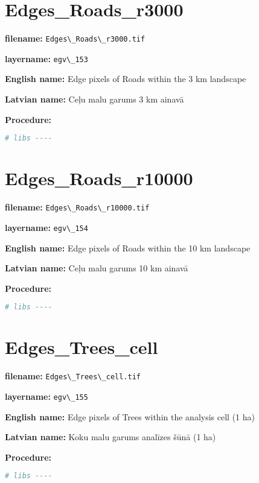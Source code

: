 \documentclass[
]{book}
\newcommand{\passthrough}[1]{#1}
\begin{document}
\section{Edges\_Roads\_r3000}\label{ch06.153}

\textbf{filename:} \passthrough{\lstinline!Edges\_Roads\_r3000.tif!}

\textbf{layername:} \passthrough{\lstinline!egv\_153!}

\textbf{English name:} Edge pixels of Roads within the 3 km landscape

\textbf{Latvian name:} Ceļu malu garums 3 km ainavā

\textbf{Procedure:}

\begin{lstlisting}[language=R]
# libs ----
\end{lstlisting}

\section{Edges\_Roads\_r10000}\label{ch06.154}

\textbf{filename:} \passthrough{\lstinline!Edges\_Roads\_r10000.tif!}

\textbf{layername:} \passthrough{\lstinline!egv\_154!}

\textbf{English name:} Edge pixels of Roads within the 10 km landscape

\textbf{Latvian name:} Ceļu malu garums 10 km ainavā

\textbf{Procedure:}

\begin{lstlisting}[language=R]
# libs ----
\end{lstlisting}

\section{Edges\_Trees\_cell}\label{ch06.155}

\textbf{filename:} \passthrough{\lstinline!Edges\_Trees\_cell.tif!}

\textbf{layername:} \passthrough{\lstinline!egv\_155!}

\textbf{English name:} Edge pixels of Trees within the analysis cell (1 ha)

\textbf{Latvian name:} Koku malu garums analīzes šūnā (1 ha)

\textbf{Procedure:}

\begin{lstlisting}[language=R]
# libs ----
\end{lstlisting}
\end{document}

